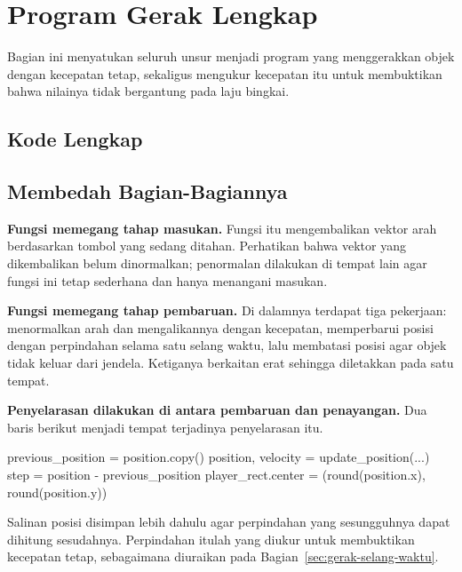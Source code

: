 \section{Program Gerak Lengkap}
\label{sec:siklus-gerak}

Bagian ini menyatukan seluruh unsur menjadi program yang menggerakkan objek
dengan kecepatan tetap, sekaligus mengukur kecepatan itu untuk membuktikan
bahwa nilainya tidak bergantung pada laju bingkai.

\subsection{Kode Lengkap}


\subsection{Membedah Bagian-Bagiannya}

\textbf{Fungsi  memegang tahap masukan.} Fungsi itu
mengembalikan vektor arah berdasarkan tombol yang sedang ditahan. Perhatikan
bahwa vektor yang dikembalikan belum dinormalkan; penormalan dilakukan di
tempat lain agar fungsi ini tetap sederhana dan hanya menangani masukan.

\textbf{Fungsi  memegang tahap pembaruan.} Di dalamnya
terdapat tiga pekerjaan: menormalkan arah dan mengalikannya dengan kecepatan,
memperbarui posisi dengan perpindahan selama satu selang waktu, lalu membatasi
posisi agar objek tidak keluar dari jendela. Ketiganya berkaitan erat sehingga
diletakkan pada satu tempat.

\textbf{Penyelarasan  dilakukan di antara pembaruan dan
penayangan.} Dua baris berikut menjadi tempat terjadinya penyelarasan itu.

\begin{kodekeluaran}
previous_position = position.copy()
position, velocity = update_position(...)
step = position - previous_position
player_rect.center = (round(position.x), round(position.y))
\end{kodekeluaran}

Salinan posisi disimpan lebih dahulu agar perpindahan yang sesungguhnya dapat
dihitung sesudahnya. Perpindahan itulah yang diukur untuk membuktikan
kecepatan tetap, sebagaimana diuraikan pada Bagian~\ref{sec:gerak-selang-waktu}.

